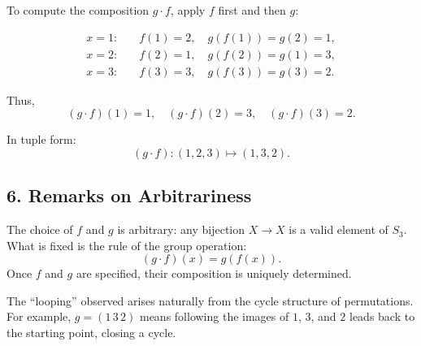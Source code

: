 \documentclass[12pt]{article}
\begin{document}
		To compute the composition $g \cdot f$, apply $f$ first and then $g$:
		
		\[
		\begin{aligned}
			x=1: &\quad f(1)=2, \quad g(f(1))=g(2)=1, \\
			x=2: &\quad f(2)=1, \quad g(f(2))=g(1)=3, \\
			x=3: &\quad f(3)=3, \quad g(f(3))=g(3)=2.
		\end{aligned}
		\]
		
		Thus,
		\[
		(g \cdot f)(1)=1, \quad (g \cdot f)(2)=3, \quad (g \cdot f)(3)=2.
		\]
		
		In tuple form:
		\[
		(g \cdot f) : (1,2,3) \mapsto (1,3,2).
		\]
		
		\subsection*{6. Remarks on Arbitrariness}
		
		The choice of $f$ and $g$ is arbitrary: any bijection $X \to X$ is a valid element of $S_3$.  
		What is fixed is the rule of the group operation:
		\[
		(g \cdot f)(x) = g(f(x)).
		\]
		Once $f$ and $g$ are specified, their composition is uniquely determined.  
		
		The “looping” observed arises naturally from the cycle structure of permutations. For example, $g=(1\,3\,2)$ means following the images of $1$, $3$, and $2$ leads back to the starting point, closing a cycle.
		
	
\end{document}
